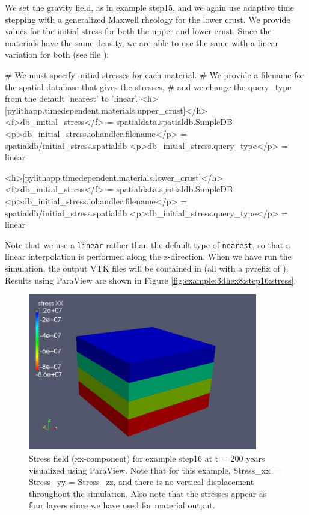We set the gravity field, as in example step15, and we again use adaptive
time stepping with a generalized Maxwell rheology for the lower crust.
We provide values for the initial stress for both the upper and lower
crust. Since the materials have the same density, we are able to use
the same  with a linear variation for both (see file
):
\begin{cfg}
# We must specify initial stresses for each material.
# We provide a filename for the spatial database that gives the stresses,
# and we change the query_type from the default 'nearest' to 'linear'.
<h>[pylithapp.timedependent.materials.upper_crust]</h>
<f>db_initial_stress</f> = spatialdata.spatialdb.SimpleDB
<p>db_initial_stress.iohandler.filename</p> = spatialdb/initial_stress.spatialdb
<p>db_initial_stress.query_type</p> = linear

<h>[pylithapp.timedependent.materials.lower_crust]</h>
<f>db_initial_stress</f> = spatialdata.spatialdb.SimpleDB
<p>db_initial_stress.iohandler.filename</p> = spatialdb/initial_stress.spatialdb
<p>db_initial_stress.query_type</p> = linear
\end{cfg}
Note that we use a \texttt{linear}  rather than
the default type of \texttt{nearest}, so that a linear interpolation
is performed along the z-direction. When we have run the simulation,
the output VTK files will be contained in 
(all with a pvrefix of ). Results using ParaView are
shown in Figure \vref{fig:example:3dhex8:step16:stress}.

\begin{figure}
  \includegraphics[width=10cm]{examples/figs/3dhex8_step16-stress_xx-t200}
  \caption{Stress field (xx-component) for example step16 at t = 200 years visualized
    using ParaView. Note that for this example, Stress\_xx = Stress\_yy
    = Stress\_zz, and there is no vertical displacement throughout the
    simulation. Also note that the stresses appear as four layers since
    we have used  for material output.}
  \label{fig:example:3dhex8:step16:stress}
\end{figure}



